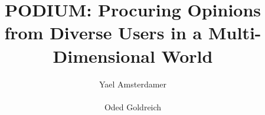 \documentclass{vldb}
\renewcommand{\epsilon}{\varepsilon}
\begin{document}

\title{PODIUM: Procuring Opinions from Diverse Users in a Multi-Dimensional World}




%
%
%
%


\author{
%
%
\alignauthor
Yael Amsterdamer\\
       \\
\alignauthor
Oded Goldreich\\
       \\
}
\end{document}
